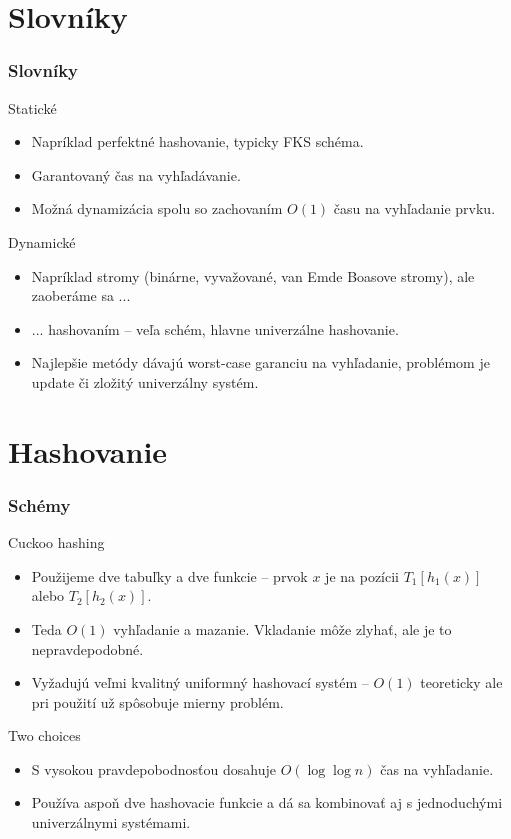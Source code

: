 \section{Slovníky}
\begin{frame}
	\frametitle{Slovníky}
	
	\begin{block}{Statické}
		\begin{itemize}
			\item Napríklad perfektné hashovanie, typicky FKS schéma.
			\item Garantovaný čas na vyhľadávanie.
			\item Možná dynamizácia spolu so zachovaním $O(1)$ času na vyhľadanie prvku.
		\end{itemize}
	\end{block}

	\begin{block}{Dynamické}
		\begin{itemize}
			\item Napríklad stromy (binárne, vyvažované, van Emde Boasove stromy), ale zaoberáme sa ...
			\item ... hashovaním -- veľa schém, hlavne univerzálne hashovanie.
			\item Najlepšie metódy dávajú worst-case garanciu na vyhľadanie, problémom je update či zložitý univerzálny systém.
		\end{itemize}
	\end{block}
\end{frame}

\section{Hashovanie}
\begin{frame}
	\frametitle{Schémy}
	
	\begin{block}{Cuckoo hashing}
		\begin{itemize}
			\item Použijeme dve tabuľky a dve funkcie -- prvok $x$ je na pozícii $T_1[h_1(x)]$ alebo $T_2[h_2(x)]$.
			\item Teda $O(1)$ vyhľadanie a mazanie. Vkladanie môže zlyhať, ale je to nepravdepodobné.
			\item Vyžadujú veľmi kvalitný uniformný hashovací systém -- $O(1)$ teoreticky ale pri použití už spôsobuje mierny problém.
		\end{itemize}
	\end{block}
	
	\begin{block}{Two choices}
		\begin{itemize}
			\item S vysokou pravdepobodnosťou dosahuje $O(\log \log n)$ čas na vyhľadanie.
			\item Používa aspoň dve hashovacie funkcie a dá sa kombinovať aj s jednoduchými univerzálnymi systémami.
		\end{itemize}
	\end{block}
\end{frame}

